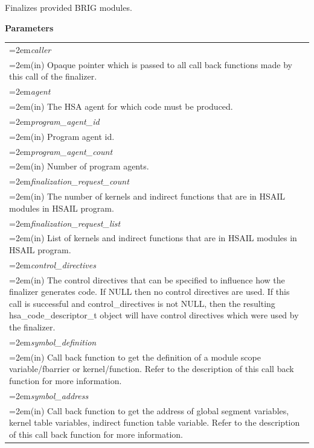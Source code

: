 \documentclass[final]{book}
\newcommand{\hsaarg}[1]{\textit{#1}}
\begin{document}
\begin{appendices}
\begin{tcolorbox}[breakable,nobeforeafter,colframe=white,colback=lightgray,left=0mm]
\end{tcolorbox}
Finalizes provided BRIG modules.

\noindent\textbf{Parameters}\\[-6mm]
\noindent\begin{longtable}{@{}>{\hangindent=2em}p{\textwidth}}
\hsaarg{caller}\\\hspace{2em}(in) Opaque pointer which is passed to all call back functions made by this call of the finalizer.\\[2mm]
\hsaarg{agent}\\\hspace{2em}(in) The HSA agent for which code must be produced.\\[2mm]
\hsaarg{program_agent_id}\\\hspace{2em}(in) Program agent id.\\[2mm]
\hsaarg{program_agent_count}\\\hspace{2em}(in) Number of program agents.\\[2mm]
\hsaarg{finalization_request_count}\\\hspace{2em}(in) The number of kernels and indirect functions that are in HSAIL modules in HSAIL program.\\[2mm]
\hsaarg{finalization_request_list}\\\hspace{2em}(in) List of kernels and indirect functions that are in HSAIL modules in HSAIL program.\\[2mm]
\hsaarg{control_directives}\\\hspace{2em}(in) The control directives that can be specified to influence how the finalizer generates code. If NULL then no control directives are used. If this call is successful and control_directives is not NULL, then the resulting hsa_code_descriptor_t object will have control directives which were used by the finalizer.\\[2mm]
\hsaarg{symbol_definition}\\\hspace{2em}(in) Call back function to get the definition of a module scope variable/fbarrier or kernel/function. Refer to the description of this call back function for more information.\\[2mm]
\hsaarg{symbol_address}\\\hspace{2em}(in) Call back function to get the address of global segment variables, kernel table variables, indirect function table variable. Refer to the description of this call back function for more information.\\[2mm]

\end{longtable}
\end{appendices}
\end{document}
